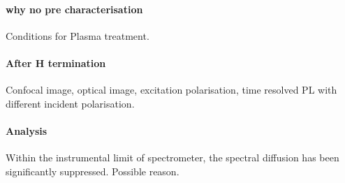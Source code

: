 \paragraph{why no pre characterisation} Conditions for Plasma treatment.
\paragraph{After H termination} Confocal image, optical image, excitation polarisation, time resolved PL with different incident polarisation.
\paragraph{Analysis} Within the instrumental limit of spectrometer, the spectral diffusion has been significantly suppressed. Possible reason.